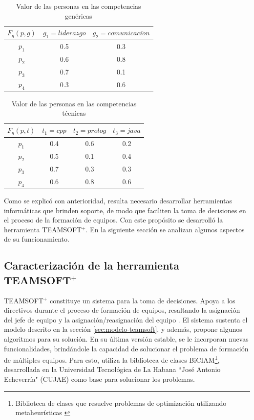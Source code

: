 \begin{table}[H]
	\centering
	\caption{Valor de las personas en las competencias genéricas}\label{pcg-sof}
	\begin{tabular}{|c|c|c|}
		\hline
		$F_g(p,g)$ & $g_1=liderazgo$ & $g_2=comunicaci\acute{o}n$ \\ \hline
		  $p_1$    &       0.5       &            0.3             \\ \hline
		  $p_2$    &       0.6       &            0.8             \\ \hline
		  $p_3$    &       0.7       &            0.1             \\ \hline
		  $p_4$    &       0.3       &            0.6             \\ \hline
	\end{tabular}
\end{table}

\begin{table}[H]
	\centering
	\caption{Valor de las personas en las competencias técnicas}\label{pct-sof}
	\begin{tabular}{|c|c|c|c|}
		\hline
		$F_g(p,t)$ & $t_1=cpp$ & $t_2=prolog$ & $t_3=java$ \\ \hline
		  $p_1$    &    0.4    &     0.6      &    0.2     \\ \hline
		  $p_2$    &    0.5    &     0.1      &    0.4     \\ \hline
		  $p_3$    &    0.7    &     0.3      &    0.3     \\ \hline
		  $p_4$    &    0.6    &     0.8      &    0.6     \\ \hline
	\end{tabular}
\end{table}

Como se explicó con anterioridad, resulta necesario desarrollar herramientas informáticas que brinden soporte, de modo que faciliten la toma de decisiones en el proceso de la formación de equipos. Con este propósito se desarrolló la herramienta TEAMSOFT$^+$. En la siguiente sección se analizan algunos aspectos de su funcionamiento. \\

\subsection{Caracterización de la herramienta TEAMSOFT$^+$} \label{sec:teamsoft}
TEAMSOFT$^+$ constituye un sistema para la toma de decisiones. Apoya a los directivos durante el proceso de formación de equipos, resaltando la asignación del jefe de equipo y la asignación/reasignación del equipo \citep{Mayi09}. El sistema sustenta el modelo descrito en la sección \ref{sec:modelo-teamsoft}, y además, propone algunos algoritmos para su solución. En su última versión estable, se le incorporan nuevas funcionalidades, brindándole la capacidad de solucionar el problema de formación de múltiples equipos. Para esto, utiliza la biblioteca de clases BiCIAM\footnote{Biblioteca de clases que resuelve problemas de optimización utilizando metaheurísticas \cite{GonzalezChaveco2021}}, desarrollada en la Universidad Tecnológica de La Habana ``José Antonio Echeverría" (CUJAE) como base para solucionar los problemas. \\

